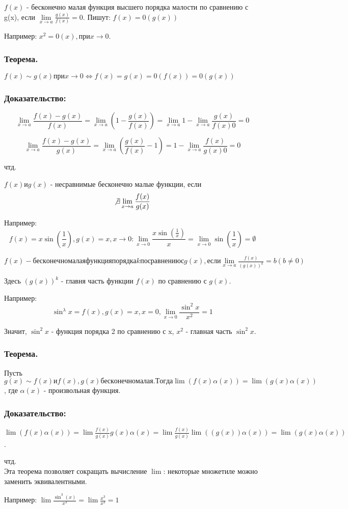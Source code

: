 	$f(x)$ - бесконечно малая функция высшего порядка малости по сравнению с g(x), если $\lim\limits_{x \rightarrow a}\frac{g(x)}{f(x)}=0$. Пишут: $f(x) = 0(g(x))$

	Например: $x^2 = 0(x), при x \rightarrow 0$.

	\subsubsection {Теорема.}
	$f(x) \sim g(x) при x \rightarrow 0 \Leftrightarrow f(x) = g(x) = 0(f(x)) = 0(g(x))$

	\subsubsection {Доказательство:}

	$$\lim\limits_{x \rightarrow a}\frac{f(x) - g(x)}{f(x)} = \lim\limits_{x \rightarrow a}\left(1 - \frac{g(x)}{f(x)}\right) =
	 \lim\limits_{x \rightarrow a}1 - \lim\limits_{x \rightarrow a}\frac{g(x)}{f(x)0}=0$$

	$$\lim\limits_{x \rightarrow a}\frac{f(x) - g(x)}{g(x)} = \lim\limits_{x \rightarrow a}\left(\frac{g(x)}{f(x)} - 1\right) =
	 1 - \lim\limits_{x \rightarrow a}\frac{f(x)}{g(x)0}=0$$

	чтд.

	$f(x) и g(x)$ - несравнимые бесконечно малые функции, если $$\not\exists \lim\limits_{x \rightarrow a}\frac{f(x)}{g(x)}$$

	Например: $$f(x) = x\sin(\frac{1}{x}), g(x)=x, x\rightarrow 0: \lim\limits_{x \rightarrow 0}\frac{x\sin(\frac{1}{x})}x =
	 \lim\limits_{x \rightarrow 0}\sin(\frac{1}{x}) = \emptyset$$

	$f(x) - бесконечно малая функция порядка k по сравнению с g(x), если \lim\limits_{x\rightarrow a}\frac{f(x)}{(g(x))^k}=b (b \neq 0)$

	Здесь $(g(x))^k$ - главня часть функции $f(x)$ по сравнению с $g(x)$.

	Например: $$\sin^{\lambda}x=f(x), g(x)=x, x=0, \lim\limits_{x \rightarrow 0}\frac{\sin^{2}x}{x^2}=1$$

	Значит, $\sin^{2}x$ - функция порядка 2 по сравнению с x, $x^2$ - главная часть $\sin^{2}x$.

	\subsubsection {Теорема.}

	Пусть $g(x) \sim f(x) и f(x), g(x) бесконечно малая. Тогда \lim(f(x)\alpha(x))=\lim(g(x)\alpha(x))$, где $\alpha(x)$ - произвольная функция.

	\subsubsection {Доказательство:}

	$\lim(f(x)\alpha(x)) = \lim\frac{f(x)}{g(x)}g(x)\alpha(x) = \lim\frac{f(x)}{g(x)} \lim((g(x)) \alpha(x)) = \lim(g(x)\alpha(x))$.

	чтд.
\\
	Эта теорема позволяет сокращать вычисление $\lim$: некоторые множетиле можно заменить эквивалентными.

	Например: $\lim\frac{\sin^{3}(x)}{x^3}=\lim\frac{x^3}{x^3}=1$
